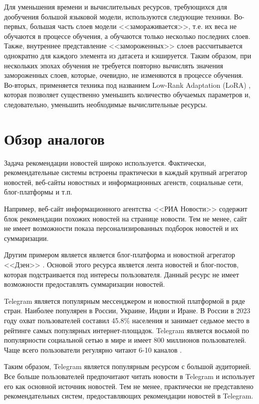 Для уменьшения времени и вычислительных ресурсов, требующихся для дообучения большой языковой модели, используются следующие техники. Во-первых, большая часть слоев модели <<замораживается>>, т.е. их веса не обучаются в процессе обучения, а обучаются только несколько последних слоев. Также, внутреннее представление <<замороженных>> слоев рассчитывается однократно для каждого элемента из датасета и кэшируется. Таким образом, при нескольких эпохах обучения не требуется повторно вычислять значения замороженных слоев, которые, очевидно, не изменяются в процессе обучения. Во-вторых, применяется техника под названием Low-Rank Adaptation (LoRA) \cite{lora}, которая позволяет существенно уменьшить количество обучаемых параметров и, следовательно, уменьшить необходимые вычислительные ресурсы.

\section{Обзор аналогов}

Задача рекомендации новостей широко используется. Фактически, рекомендательные системы встроены практически в каждый крупный агрегатор новостей, веб-сайты новостных и информационных агенств, социальные сети, блог-платформы и т.п.

Например, веб-сайт информационного агентства <<РИА Новости>> \cite{ria_news} содержит блок рекомендации похожих новостей на странице новости. Тем не менее, сайт не имеет возможности показа персонализированных подборок новостей и их суммаризации.

Другим примером является является блог-платформа и новостной агрегатор <<Дзен>> \cite{dzen}. Основой этого ресурса является лента новостей и блог-постов, которая подстраивается под интересы пользователя. Данный ресурс не имеет возможности предоставлять суммаризации новостей.

Telegram \cite{telegram} является популярным мессенджером и новостной платформой в ряде стран. Наиболее популярен в России, Украине, Индии и Иране. В России в 2023 году охват пользователей составил 45.8\% населения и занимает седьмое место в рейтинге самых популярных интернет-площадок. Telegram является восьмой по популярности социальной сетью в мире и имеет 800 миллионов пользователей. Чаще всего пользователи регулярно читают 6-10 каналов \cite{telegram_stat}.

Таким образом, Telegram является популярным ресурсом с большой аудиторией. Все больше пользователей предпочитают читать новости в Telegram и использует его как основной источник новостей. Тем не менее, практически не представлено рекомендательных систем, предоставляющих рекомендации новостей в Telegram.

